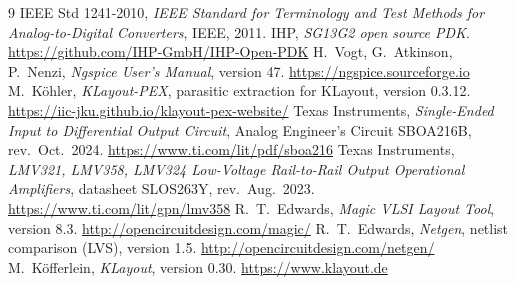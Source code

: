 \begin{thebibliography}{9}
 IEEE Std 1241-2010, \emph{IEEE Standard for Terminology and Test Methods for
  Analog-to-Digital Converters}, IEEE, 2011.
 IHP, \emph{SG13G2 open source PDK}. \url{https://github.com/IHP-GmbH/IHP-Open-PDK}
 H.~Vogt, G.~Atkinson, P.~Nenzi, \emph{Ngspice User's Manual}, version 47.
  \url{https://ngspice.sourceforge.io}
 M.~K\"ohler, \emph{KLayout-PEX}, parasitic extraction for KLayout, version 0.3.12.
  \url{https://iic-jku.github.io/klayout-pex-website/}
 Texas Instruments, \emph{Single-Ended Input to Differential Output Circuit},
  Analog Engineer's Circuit SBOA216B, rev.\ Oct.\ 2024. \url{https://www.ti.com/lit/pdf/sboa216}
 Texas Instruments, \emph{LMV321, LMV358, LMV324 Low-Voltage Rail-to-Rail Output
  Operational Amplifiers}, datasheet SLOS263Y, rev.\ Aug.\ 2023. \url{https://www.ti.com/lit/gpn/lmv358}
 R.~T.~Edwards, \emph{Magic VLSI Layout Tool}, version 8.3.
  \url{http://opencircuitdesign.com/magic/}
 R.~T.~Edwards, \emph{Netgen}, netlist comparison (LVS), version 1.5.
  \url{http://opencircuitdesign.com/netgen/}
 M.~K\"offerlein, \emph{KLayout}, version 0.30. \url{https://www.klayout.de}
\end{thebibliography}
